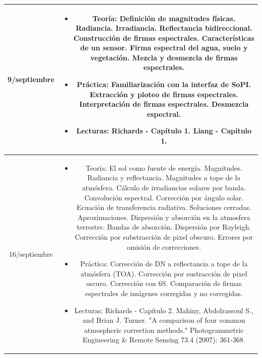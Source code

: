\documentclass[11pt]{article}
\begin{document}
\begin{longtable}[h!]{| c | c | }
\hline
9/septiembre & \begin{minipage}{.65\textwidth}
\begin{itemize} 
    \vspace{1mm}
  \item Teoría: Definición de magnitudes físicas. Radiancia. Irradiancia. Reflectancia bidireccional. Construcción de firmas espectrales. Características de un sensor. Firma espectral del agua, suelo y vegetación. Mezcla y desmezcla de firmas espectrales.
  \item Práctica: Familiarización con la interfaz de SoPI\@. Extracción y ploteo de firmas espectrales. Interpretación de firmas espectrales. Desmezcla espectral.
	\item Lecturas: Richards - Capítulo 1. Liang - Capítulo 1.
    \vspace{1mm}
\end{itemize}
\end{minipage} \\
\hline
16/septiembre & \begin{minipage}{.65\textwidth}
\begin{itemize} 
    \vspace{1mm}
	\item Teoría: El sol como fuente de energía. Magnitudes. Radiancia y reflectancia. Magnitudes a tope de la atmósfera. Cálculo de irradiancias solares por banda. Convolución espectral. Corrección por ángulo solar. Ecuación de transferencia radiativa. Soluciones cerradas. Aproximaciones. Dispersión y absorción en la atmosfera terrestre. Bandas de absorción. Dispersión por Rayleigh. Corrección por substracción de pixel obscuro. Errores por omisión de correcciones.
  \item Práctica: Corrección de DN a reflectancia a tope de la atmósfera (TOA). Corrección por sustracción de pixel oscuro. Corrección con 6S. Comparación de firmas espectrales de imágenes corregidas y no corregidas.
	\item Lecturas: Richards - Capítulo 2. Mahiny, Abdolrassoul S., and Brian J.
        Turner. "A comparison of four common atmospheric correction methods."
        Photogrammetric Engineering \& Remote Sensing 73.4 (2007): 361-368.
    \vspace{1mm}
\end{itemize}
\end{minipage} \\


\end{longtable}
\end{document}
